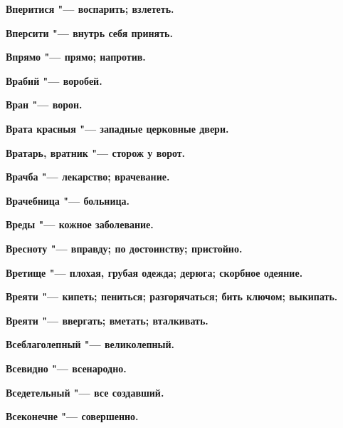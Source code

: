 \begin{multicols}{2}
\bfseries Вперитися\normalfont{} "--- воспарить; взлететь. 




\bfseries Вперсити\normalfont{} "--- внутрь себя принять. 




\bfseries Впрямо\normalfont{} "--- прямо; напротив. 




\bfseries Врабий\normalfont{} "--- воробей. 




\bfseries Вран\normalfont{} "--- ворон. 




\bfseries Врата красныя\normalfont{} "--- западные церковные двери. 




\bfseries Вратарь, вратник\normalfont{} "--- сторож у ворот. 




\bfseries Врачба\normalfont{} "--- лекарство; врачевание. 




\bfseries Врачебница\normalfont{} "--- больница. 




\bfseries Вреды\normalfont{} "--- кожное заболевание. 




\bfseries Вресноту\normalfont{} "--- вправду; по достоинству; пристойно. 




\bfseries Вретище\normalfont{} "--- плохая, грубая одежда; дерюга; скорбное одеяние. 




\bfseries Вреяти\normalfont{} "--- кипеть; пениться; разгорячаться; бить ключом; выкипать. 




\bfseries Вреяти\normalfont{} "--- ввергать; вметать; вталкивать. 




\bfseries Всеблаголепный\normalfont{} "--- великолепный. 




\bfseries Всевидно\normalfont{} "--- всенародно. 




\bfseries Вседетельный\normalfont{} "--- все создавший. 




\bfseries Всеконечне\normalfont{} "--- совершенно. 





\end{multicols}
